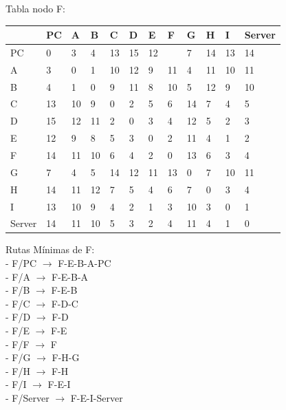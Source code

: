 \documentclass[a4paper]{article}
\begin{document}
\begin{table}[ht]
Tabla nodo F:\\
\begin{tabular}{|l|l|l|l|l|l|l|l|l|l|l|l|}
\hline
       & PC & A  & B & C & D & E & F & G & H & I  & Server \\ \hline
PC     & 0  & 3  & 4 & 13& 15& 12&   & 7 & 14& 13 & 14     \\ \hline
A      & 3  & 0  & 1 & 10& 12& 9 & 11& 4 & 11& 10 & 11     \\ \hline
B      & 4  & 1  & 0 & 9 & 11& 8 & 10& 5 & 12& 9  & 10     \\ \hline
C      & 13 & 10 & 9 & 0 & 2 & 5 & 6 & 14& 7 & 4  & 5      \\ \hline
D      & 15 & 12 & 11& 2 & 0 & 3 & 4 & 12& 5 & 2  & 3      \\ \hline
E      & 12 & 9  & 8 & 5 & 3 & 0 & 2 & 11& 4 & 1  & 2      \\ \hline
F      & 14 & 11 & 10& 6 & 4 & 2 & 0 & 13& 6 & 3  & 4      \\ \hline
G      & 7  & 4  & 5 & 14& 12& 11& 13& 0 & 7 & 10 & 11     \\ \hline
H      & 14 & 11 & 12& 7 & 5 & 4 & 6 & 7 & 0 & 3  & 4      \\ \hline
I      & 13 & 10 & 9 & 4 & 2 & 1 & 3 & 10& 3 & 0  & 1      \\ \hline
Server & 14 & 11 & 10& 5 & 3 & 2 & 4 & 11& 4 & 1  & 0      \\ \hline
\end{tabular}

Rutas Mínimas de F:\\
-	F/PC  $\rightarrow$  F-E-B-A-PC\\
-	F/A  $\rightarrow$  F-E-B-A\\
-	F/B  $\rightarrow$ F-E-B\\
-	F/C  $\rightarrow$  F-D-C\\
-	F/D  $\rightarrow$  F-D\\
-	F/E  $\rightarrow$  F-E\\
-	F/F  $\rightarrow$  F\\
-	F/G  $\rightarrow$  F-H-G\\
-	F/H  $\rightarrow$  F-H\\
-	F/I  $\rightarrow$  F-E-I\\
-	F/Server  $\rightarrow$  F-E-I-Server\\
\end{table}

\clearpage
\end{document}
